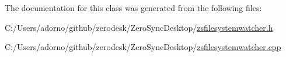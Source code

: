 The documentation for this class was generated from the following files\-:\begin{DoxyCompactItemize}
\item 
C\-:/\-Users/adorno/github/zerodesk/\-Zero\-Sync\-Desktop/\hyperlink{zsfilesystemwatcher_8h}{zsfilesystemwatcher.\-h}\item 
C\-:/\-Users/adorno/github/zerodesk/\-Zero\-Sync\-Desktop/\hyperlink{zsfilesystemwatcher_8cpp}{zsfilesystemwatcher.\-cpp}\end{DoxyCompactItemize}
